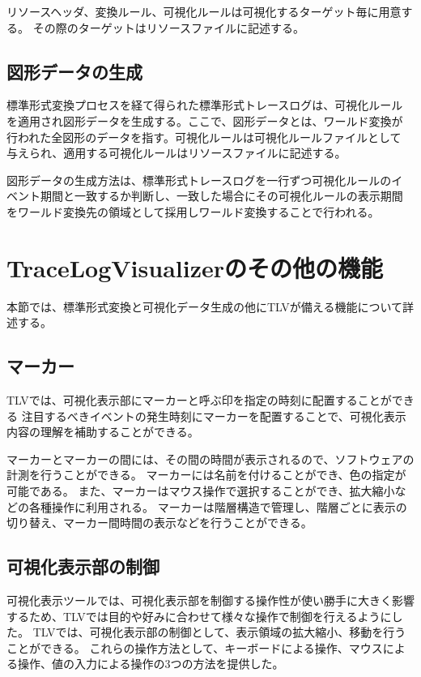 リソースヘッダ、変換ルール、可視化ルールは可視化するターゲット毎に用意する。
その際のターゲットはリソースファイルに記述する。

\subsection{図形データの生成}\label{visualizeRule}
標準形式変換プロセスを経て得られた標準形式トレースログは、可視化ルール
を適用され図形データを生成する。ここで、図形データとは、ワールド変換が
行われた全図形のデータを指す。可視化ルールは可視化ルールファイルとして
与えられ、適用する可視化ルールはリソースファイルに記述する。

図形データの生成方法は、標準形式トレースログを一行ずつ可視化ルールのイ
ベント期間と一致するか判断し、一致した場合にその可視化ルールの表示期間
をワールド変換先の領域として採用しワールド変換することで行われる。

\section{TraceLogVisualizerのその他の機能}

本節では、標準形式変換と可視化データ生成の他にTLVが備える機能について詳述する。

\subsection{マーカー}
TLVでは、可視化表示部にマーカーと呼ぶ印を指定の時刻に配置することができる
注目するべきイベントの発生時刻にマーカーを配置することで、可視化表示内容の理解を補助することができる。

マーカーとマーカーの間には、その間の時間が表示されるので、ソフトウェアの計測を行うことができる。
マーカーには名前を付けることができ、色の指定が可能である。
また、マーカーはマウス操作で選択することができ、拡大縮小などの各種操作に利用される。
マーカーは階層構造で管理し、階層ごとに表示の切り替え、マーカー間時間の表示などを行うことができる。

\subsection{可視化表示部の制御}

可視化表示ツールでは、可視化表示部を制御する操作性が使い勝手に大きく影響するため、TLVでは目的や好みに合わせて様々な操作で制御を行えるようにした。
TLVでは、可視化表示部の制御として、表示領域の拡大縮小、移動を行うことができる。
これらの操作方法として、キーボードによる操作、マウスによる操作、値の入力による操作の3つの方法を提供した。

